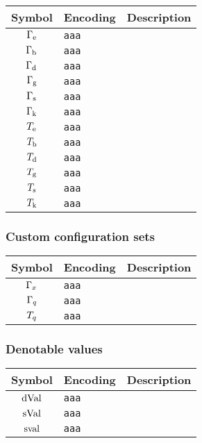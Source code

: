 \documentclass[11pt]{article}
\begin{document}
\begin{table}[H]
	\def\arraystretch{1.5}
	\begin{tabular}{c l l}
		\textbf{Symbol} & \textbf{Encoding} & \textbf{Description} \\
		\hline
		$\Gamma_\mathrm{e}$ & \texttt{aaa} &  \\
		$\Gamma_\mathrm{b}$ & \texttt{aaa} &  \\
		$\Gamma_\mathrm{d}$ & \texttt{aaa} &  \\
		$\Gamma_\mathrm{g}$ & \texttt{aaa} &  \\
		$\Gamma_\mathrm{s}$ & \texttt{aaa} &  \\
		$\Gamma_\mathrm{k}$ & \texttt{aaa} &  \\
		$T_\mathrm{e}$ & \texttt{aaa} &  \\
		$T_\mathrm{b}$ & \texttt{aaa} &  \\
		$T_\mathrm{d}$ & \texttt{aaa} &  \\
		$T_\mathrm{g}$ & \texttt{aaa} &  \\
		$T_\mathrm{s}$ & \texttt{aaa} &  \\
		$T_\mathrm{k}$ & \texttt{aaa} &  \\
	\end{tabular} 
\end{table}

\subsubsection{Custom configuration sets}

\begin{table}[H]
	\def\arraystretch{1.5}
	\begin{tabular}{c l l}
		\textbf{Symbol} & \textbf{Encoding} & \textbf{Description} \\
		\hline
		$\Gamma_{x}$ & \texttt{aaa} &  \\
		$\Gamma_q$ & \texttt{aaa} &  \\
		$T_q$ & \texttt{aaa} &  \\
	\end{tabular} 
\end{table}

\subsubsection{Denotable values}

\begin{table}[H]
	\def\arraystretch{1.5}
	\begin{tabular}{c l l}
		\textbf{Symbol} & \textbf{Encoding} & \textbf{Description} \\
		\hline
		$\mathrm{dVal}$ & \texttt{aaa} &  \\
		$\mathrm{sVal}$ & \texttt{aaa} &  \\
		$\mathrm{sval}$ & \texttt{aaa} &  \\
	\end{tabular} 
\end{table}
\end{document}
